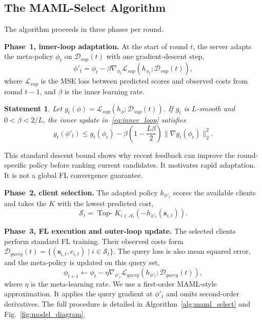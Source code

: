 \documentclass[journal]{IEEEtran}
\newtheorem{Statement}{Statement}
\newcommand{\revision}[1]{#1}
\begin{document}
\subsection{The MAML-Select Algorithm}
The algorithm proceeds in three phases per round.

\textbf{Phase~1, inner-loop adaptation.}
At the start of round $t$, \revision{the server adapts the meta-policy $\phi_t$ on $\mathcal{D}_{sup}(t)$ with one gradient-descent step,}
\begin{equation}
		\phi'_t = \phi_t - \beta \nabla_{\phi_t} \mathcal{L}_{sup}(h_{\phi_t};\mathcal{D}_{sup}(t)),
		\label{eq:inner_loop}
\end{equation}
where $\mathcal{L}_{sup}$ is the MSE loss between predicted scores and observed costs from round $t-1$, and $\beta$ is the inner learning rate.

{
\begin{Statement}
Let $g_t(\phi)=\mathcal{L}_{sup}(h_\phi;\mathcal{D}_{sup}(t))$. If $g_t$ is $L$-smooth and $0<\beta<2/L$, the inner update in~\eqref{eq:inner_loop} satisfies
\[
g_t(\phi'_t) \leq g_t(\phi_t)
-\beta\left(1-\frac{L\beta}{2}\right)
\|\nabla g_t(\phi_t)\|_2^2.
\]
\end{Statement}
This standard descent bound shows why recent feedback can improve the round-specific policy before ranking current candidates. It motivates rapid adaptation. It is not a global FL convergence guarantee.
}

\textbf{Phase~2, client selection.}
\revision{The adapted policy $h_{\phi'_t}$ scores the available clients and takes the $K$ with the lowest predicted cost,}
\begin{equation}
	\mathcal{S}_t = \operatorname{Top-}K_{i \in \mathcal{A}_t} \left( -h_{\phi'_t}(\bm{s}_{i,t}) \right).
	\label{eq:selection}
\end{equation}

\textbf{Phase~3, FL execution and outer-loop update.}
\revision{The selected clients perform standard FL training. Their observed costs form $\mathcal{D}_{query}(t)=\{(\bm{s}_{i,t},c_{i,t})\mid i\in\mathcal{S}_t\}$. The query loss is also mean squared error, and the meta-policy is updated on this query set,}
\begin{equation}
		\phi_{t+1} \leftarrow \phi_t - \eta \nabla_{\phi'_t} \mathcal{L}_{query}(h_{\phi'_t}; \mathcal{D}_{query}(t)),
		\label{eq:outer_loop}
\end{equation}
\revision{where $\eta$ is the meta-learning rate. We use a first-order MAML-style approximation. It applies the query gradient at $\phi'_t$ and omits second-order derivatives. The full procedure is detailed in Algorithm~\ref{alg:maml_select} and Fig.~\ref{fig:model_diagram}.}
\end{document}
